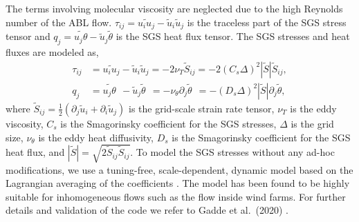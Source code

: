 \documentclass[%
 aip,
 amsmath,amssymb,
reprint,
twocolumn,%
author-numerical,%
]{revtex4-1}
\begin{document}
The terms involving molecular viscosity are neglected due to the high Reynolds number of the ABL flow. $\tau_{\mathit{ij}}=\widetilde{u_{\mathit{i}}u_{\mathit{j}}}-\widetilde{u}_\mathit{i}\widetilde{u}_\mathit{j}$ is the traceless part of the SGS stress tensor and $q_\mathit{j}=\widetilde{u_\mathit{j}\theta}-\widetilde{u}_\mathit{j}\widetilde{\theta}$ is the SGS heat flux tensor. The SGS stresses and heat fluxes are modeled as,
%
\begin{align}
 \tau_{\mathit{ij}}&=\widetilde{u_{\mathit{i}}u_{\mathit{j}}}-\widetilde{u}_\mathit{i}\widetilde{u}_\mathit{j}=-2\nu_{T}\widetilde{S}_{ij}=-2(C_s\Delta)^2|\widetilde{S}|\widetilde{S}_{ij},\label{eqn4}\\
 q_\mathit{j}&=\widetilde{u_\mathit{j}\theta}~~-\widetilde{u}_\mathit{j}\widetilde{\theta}~~=-\nu_\theta\partial_j\widetilde{\theta}~~=-(D_s\Delta)^2|\widetilde{S}|\partial_j\widetilde{\theta},\label{eqn5}
\end{align}
%
where $\widetilde{S}_{ij}=\frac{1}{2}\left(\partial_j{\widetilde{u}_i} + \partial_i{\widetilde{u}_j}\right)$ is the grid-scale strain rate tensor, $\nu_T$ is the eddy viscosity, $C_s$ is the Smagorinsky coefficient for the SGS stresses, $\Delta$ is the grid size, $\nu_\theta$ is the eddy heat diffusivity, $D_s$ is the Smagorinsky coefficient for the SGS heat flux, and $|\widetilde{S}| = \sqrt{2\widetilde{S}_{ij}\widetilde{S}_{ij}}$. To model the SGS stresses without any ad-hoc modifications, we use a tuning-free, scale-dependent, dynamic model based on the Lagrangian averaging of the coefficients \cite{bou05, sto06, sto08}. The model has been found to be highly suitable for inhomogeneous flows such as the flow inside wind farms\cite{ste16}. For further details and validation of the code we refer to Gadde et al.\ (2020) \cite{nag20}. 
\end{document}
